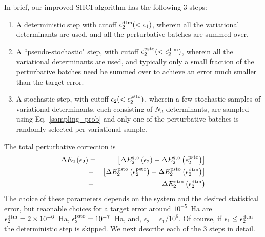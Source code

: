 \documentclass[%
reprint,
 superscriptaddress,
 amsmath,amssymb,
 aps,
]{revtex4-1}
\def\beq{\begin{eqnarray}}
\def\eeq{\end{eqnarray}}
\begin{document}
In brief, our improved SHCI algorithm has the following 3 steps:
\begin{enumerate}
\item A deterministic step with cutoff $\epsilon_2^{\rm dtm} (< \epsilon_1)$, wherein
{\color{black} all the variational determinants are used}, and
all the perturbative batches are summed over.
\item A ``pseudo-stochastic" step, with cutoff $\epsilon_2^{\rm psto} (< \epsilon_2^{\rm dtm})$, wherein
{\color{black} all the variational determinants are used}, and
typically only a small fraction of the perturbative batches
need be summed over to achieve an error much smaller than the target error.
\item A stochastic step, with cutoff $\epsilon_2 (<\epsilon_2^{\rm psto}) $, wherein a few stochastic samples of variational determinants,
each consisting of $N_d$ determinants, are sampled using Eq.~\ref{sampling_prob} and only one of the
perturbative batches is randomly selected per variational sample.
\end{enumerate}
{\color{black}
The total perturbative correction is
\beq
\Delta E_{2} \left(\epsilon_{2}\right) &=& 
  \left[\Delta E_{2}^{\mathrm{sto}} \left(\epsilon_{2} \right) - \Delta E_{2}^{\mathrm{sto}} \left(\epsilon_{2}^{\rm psto}\right)\right] \nonumber \\
&+& \left[\Delta E_{2}^{\mathrm{psto}} \left(\epsilon_{2}^{\rm psto} \right) - \Delta E_{2}^{\mathrm{psto}} \left(\epsilon_{2}^{\rm dtm}\right)\right] \nonumber \\
&+& \Delta E_{2} ^{\mathrm{dtm}} \left(\epsilon_{2} ^{\mathrm{dtm}}\right)
\label{eq:semistoch_3-step_PT}
\eeq
}
The choice of these parameters depends on the system and the desired statistical error, but
reaonable choices for a target error around $10^{-5}$~Ha are
$\epsilon_2^{\rm dtm} = 2\times 10^{-6}$~Ha,
$\epsilon_2^{\rm psto} = 10^{-7}$~Ha, and,
$\epsilon_2 = \epsilon_{1}/10^6$.
{\color{black} Of course, if $\epsilon_1 \le \epsilon_2^{\rm dtm}$ the deterministic step is skipped.
}
We next describe each of the 3 steps in detail.
\end{document}
